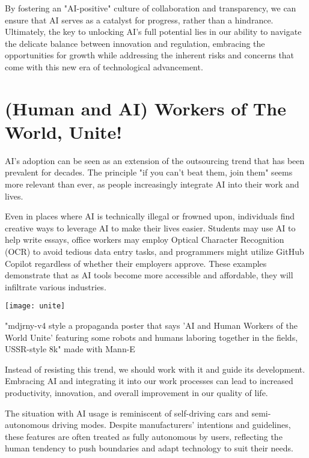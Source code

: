 By fostering an "AI-positive" culture of collaboration and transparency, we can ensure that AI serves as a catalyst for progress, rather than a hindrance. Ultimately, the key to unlocking AI's full potential lies in our ability to navigate the delicate balance between innovation and regulation, embracing the opportunities for growth while addressing the inherent risks and concerns that come with this new era of technological advancement.

\section{(Human and AI) Workers of The World, Unite!}

AI's adoption can be seen as an extension of the outsourcing trend that has been prevalent for decades. The principle "if you can't beat them, join them" seems more relevant than ever, as people increasingly integrate AI into their work and lives.

Even in places where AI is technically illegal or frowned upon, individuals find creative ways to leverage AI to make their lives easier. Students may use AI to help write essays, office workers may employ Optical Character Recognition (OCR) to avoid tedious data entry tasks, and programmers might utilize GitHub Copilot regardless of whether their employers approve. These examples demonstrate that as AI tools become more accessible and affordable, they will infiltrate various industries.

\begin{marginfigure}[-5.5cm]
    \texttt{[image: unite]}
        \caption{"mdjrny-v4 style a propaganda poster that says 'AI and Human Workers of the World Unite' featuring some robots and humans laboring together in the fields, USSR-style 8k" made with Mann-E}
\end{marginfigure}

Instead of resisting this trend, we should work with it and guide its development. Embracing AI and integrating it into our work processes can lead to increased productivity, innovation, and overall improvement in our quality of life.

The situation with AI usage is reminiscent of self-driving cars and semi-autonomous driving modes. Despite manufacturers' intentions and guidelines, these features are often treated as fully autonomous by users, reflecting the human tendency to push boundaries and adapt technology to suit their needs.

